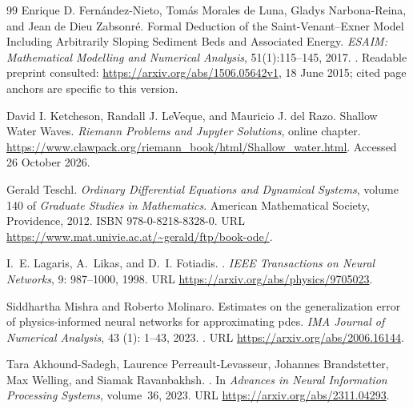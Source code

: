 \documentclass[11pt,a4paper,oneside]{report}
\numberwithin{equation}{chapter}
\begin{document}
\begin{thebibliography}{99}
Enrique D. Fern\'andez-Nieto, Tom\'as Morales de Luna,
Gladys Narbona-Reina, and Jean de Dieu Zabsonr\'e.
\newblock Formal Deduction of the Saint-Venant--Exner Model Including
Arbitrarily Sloping Sediment Beds and Associated Energy.
\newblock \emph{ESAIM: Mathematical Modelling and Numerical Analysis},
51(1):115--145, 2017.
\newblock {}.
\newblock Readable preprint consulted: \url{https://arxiv.org/abs/1506.05642v1},
18 June 2015; cited page anchors are specific to this version.

David I. Ketcheson, Randall J. LeVeque, and Mauricio J. del Razo.
\newblock Shallow Water Waves.
\newblock \emph{Riemann Problems and Jupyter Solutions}, online chapter.
\newblock \url{https://www.clawpack.org/riemann_book/html/Shallow_water.html}.
\newblock Accessed 26 October 2026.

Gerald Teschl.
\newblock \emph{Ordinary Differential Equations and Dynamical Systems}, volume
  140 of \emph{Graduate Studies in Mathematics}.
\newblock American Mathematical Society, Providence, 2012.
\newblock ISBN 978-0-8218-8328-0.
\newblock URL \url{https://www.mat.univie.ac.at/~gerald/ftp/book-ode/}.

I.~E. Lagaris, A.~Likas, and D.~I. Fotiadis.
.
\newblock \emph{IEEE Transactions on Neural Networks}, 9: 987--1000,
  1998.
\newblock URL \url{https://arxiv.org/abs/physics/9705023}.

Siddhartha Mishra and Roberto Molinaro.
\newblock Estimates on the generalization error of physics-informed neural
  networks for approximating pdes.
\newblock \emph{IMA Journal of Numerical Analysis}, 43 (1):
  1--43, 2023.
\newblock {}.
\newblock URL \url{https://arxiv.org/abs/2006.16144}.

Tara Akhound-Sadegh, Laurence Perreault-Levasseur, Johannes Brandstetter, Max
  Welling, and Siamak Ravanbakhsh.
.
\newblock In \emph{Advances in Neural Information Processing Systems},
  volume~36, 2023.
\newblock URL \url{https://arxiv.org/abs/2311.04293}.


\end{thebibliography}
\end{document}
